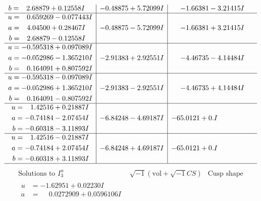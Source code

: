 \documentclass[1p]{elsarticle_modified}
\theoremstyle{definition}
\newcommand{\I}{\sqrt{-1}}
\begin{document}
$$\begin{array}{c|c|c}
\begin{aligned}
b &= \phantom{-}2.68879 + 0.12558 I\end{aligned}
 & -0.48875 + 5.72099 I & -1.66381 - 3.21415 I \\ \hline\begin{aligned}
u &= \phantom{-}0.659269 - 0.077443 I \\
a &= \phantom{-}4.04500 + 0.28467 I \\
b &= \phantom{-}2.68879 - 0.12558 I\end{aligned}
 & -0.48875 - 5.72099 I & -1.66381 + 3.21415 I \\ \hline\begin{aligned}
u &= -0.595318 + 0.097089 I \\
a &= -0.052986 - 1.365210 I \\
b &= \phantom{-}0.164091 + 0.807592 I\end{aligned}
 & -2.91383 + 2.92551 I & -4.46735 - 4.14484 I \\ \hline\begin{aligned}
u &= -0.595318 - 0.097089 I \\
a &= -0.052986 + 1.365210 I \\
b &= \phantom{-}0.164091 - 0.807592 I\end{aligned}
 & -2.91383 - 2.92551 I & -4.46735 + 4.14484 I \\ \hline\begin{aligned}
u &= \phantom{-}1.42516 + 0.21887 I \\
a &= -0.74184 - 2.07454 I \\
b &= -0.60318 - 3.11893 I\end{aligned}
 & -6.84248 - 4.69187 I & -65.0121 + 0. I\phantom{ +0.000000I} \\ \hline\begin{aligned}
u &= \phantom{-}1.42516 - 0.21887 I \\
a &= -0.74184 + 2.07454 I \\
b &= -0.60318 + 3.11893 I\end{aligned}
 & -6.84248 + 4.69187 I & -65.0121 + 0. I\phantom{ +0.000000I}\\
 \hline 
 \end{array}$$\newpage$$\begin{array}{c|c|c}  
\text{Solutions to }I^u_{3}& \I (\text{vol} + \sqrt{-1}CS) & \text{Cusp shape}\\
 \hline 
\begin{aligned}
u &= -1.62951 + 0.02230 I \\
a &= \phantom{-}0.0272909 + 0.0596106 I \\

\end{aligned}
\end{array}$$
\end{document}

